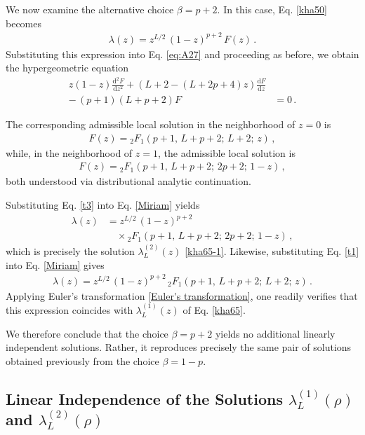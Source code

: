 \documentclass[aps,twocolumn,nofootinbib]{revtex4}
\begin{document}
{\begin{appendix}
We now examine the alternative choice $\beta=p+2$. In this case, Eq. \eqref{kha50} becomes
\begin{align}\label{Miriam}
    \lambda(z) = z^{L/2}\, (1-z)^{p+2} \,F(z)\,.
\end{align}
Substituting this expression into Eq. \eqref{eq:A27} and proceeding as before, we obtain the hypergeometric equation
\begin{align}\label{123} 
    z(1-z)\frac{\mathrm{d}^2F}{\mathrm{d}z^2} + \left(L+2-(L+2p+4)z\right)\frac{\mathrm{d}F}{\mathrm{d}z} & \nonumber\\[3pt] -\, (p+1)(L+p+2)F &= 0 \,. 
\end{align}

The corresponding admissible local solution in the neighborhood of $z=0$ is
\begin{align}\label{t1}
    F(z) = {}_2F_1(p+1,\, L+p+2;\, L+2;\, z)\,,
\end{align}
while, in the neighborhood of $z=1$, the admissible local solution is
\begin{align}\label{t3}
    F(z) = {}_2F_1(p+1,\, L+p+2;\, 2p+2;\, 1-z)\,,
\end{align}
both understood via distributional analytic continuation.

Substituting Eq. \eqref{t3} into Eq. \eqref{Miriam} yields
\begin{align}
    \lambda(z) &= z^{L/2} \,(1-z)^{p+2} \nonumber\\[3pt]
    & \quad \times {}_2F_1(p+1,\, L+p+2;\, 2p+2;\, 1-z)\,,
\end{align}
which is precisely the solution $\lambda_L^{(2)}(z)$ \eqref{kha65-1}. Likewise, substituting Eq. \eqref{t1} into Eq. \eqref{Miriam} gives
\begin{align}
    \lambda(z) = z^{L/2} \,(1-z)^{p+2} \,
    {}_2F_1(p+1,\, L+p+2;\, L+2;\, z)\,.
\end{align}
Applying Euler's transformation \eqref{Euler's transformation}, one readily verifies that this expression coincides with $\lambda_L^{(1)}(z)$ of Eq. \eqref{kha65}.

We therefore conclude that the choice $\beta=p+2$ yields no additional linearly independent solutions. Rather, it reproduces precisely the same pair of solutions obtained previously from the choice $\beta=1-p$.


\subsection{Linear Independence of the Solutions $\lambda_L^{(1)}(\rho)$ and $\lambda_L^{(2)}(\rho)$}\label{App. Linear Independence of the Two Solutions}


\end{appendix}}
\end{document}

